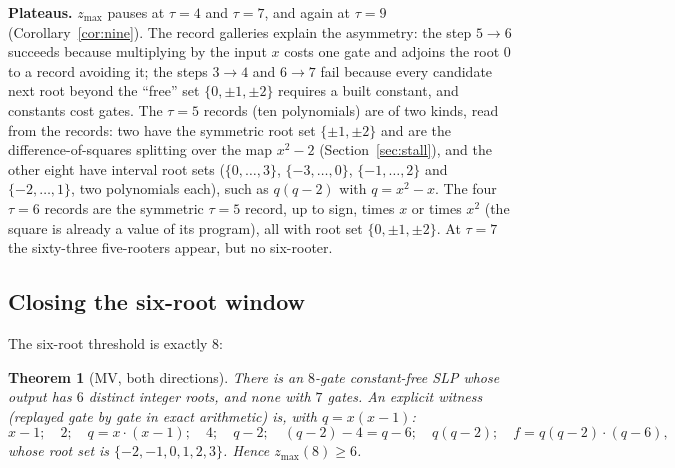 \documentclass[11pt]{article}
\newtheorem{theorem}{Theorem}[section]
\theoremstyle{definition}
\theoremstyle{remark}
\newcommand{\zmax}{z_{\max}}
\begin{document}
\textbf{Plateaus.} $\zmax$ pauses at $\tau = 4$ and $\tau = 7$, and again at $\tau = 9$
(Corollary~\ref{cor:nine}). The record galleries
explain the asymmetry: the step $5 \to 6$ succeeds because multiplying by the input
$x$ costs one gate and adjoins the root $0$ to a record avoiding it; the steps
$3 \to 4$ and $6 \to 7$ fail because every candidate next root beyond the ``free''
set $\{0, \pm 1, \pm 2\}$ requires a built constant, and constants cost gates. The
$\tau = 5$ records (ten polynomials) are of two kinds, read from the records: two have the
symmetric root set $\{\pm1,\pm2\}$ and are the difference-of-squares splitting over the map
$x^2 - 2$ (Section~\ref{sec:stall}), and the other eight have interval root sets
($\{0,\dots,3\}$, $\{-3,\dots,0\}$, $\{-1,\dots,2\}$ and $\{-2,\dots,1\}$, two polynomials each),
such as $q(q-2)$ with $q = x^2 - x$. The four $\tau = 6$ records are the symmetric $\tau = 5$
record, up to sign, times $x$ or times $x^2$ (the square is already a value of its program), all with root set
$\{0,\pm1,\pm2\}$. At $\tau = 7$ the sixty-three five-rooters
appear, but no six-rooter.

\subsection{Closing the six-root window}\label{sec:window}

The six-root threshold is exactly $8$:

\begin{theorem}[MV, both directions]\label{thm:window}
There is an $8$-gate constant-free SLP whose output has $6$ distinct integer roots,
and none with $7$ gates. An explicit witness (replayed gate by gate in exact
arithmetic) is, with $q = x(x-1)$:
\[
x{-}1;\quad 2;\quad q = x\cdot(x{-}1);\quad 4;\quad q{-}2;\quad (q{-}2){-}4 = q{-}6;\quad
q(q{-}2);\quad f = q(q{-}2)\cdot(q{-}6),
\]
whose root set is $\{-2, -1, 0, 1, 2, 3\}$. Hence $\zmax(8) \ge 6$.
\end{theorem}
\end{document}

